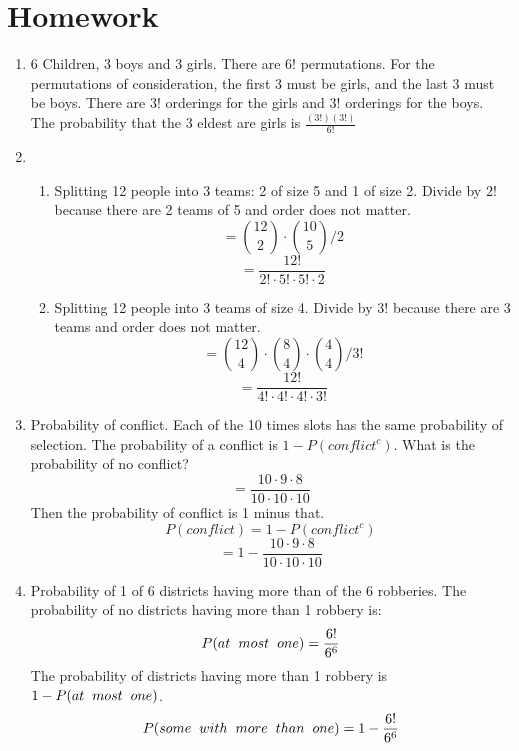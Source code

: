 \documentclass[11pt, oneside]{article}   	%
\begin{document}
\pagebreak
\section{Homework}
	\begin{enumerate}
		\item 6 Children, 3 boys and 3 girls. There are $6!$ permutations. For the permutations of consideration, the first 3 must be girls, and the last 3 must be boys. There are $3!$ orderings for the girls and $3!$ orderings for the boys. The probability that the 3 eldest are girls is $\frac{(3!)(3!)}{6!}$
		\item
			\begin{enumerate}
				\item Splitting 12 people into 3 teams: 2 of size 5 and 1 of size 2. Divide by $2!$ because there are 2 teams of 5 and order does not matter.
					\[
						= \binom{12}{2} \cdot \binom{10}{5} / 2
					\]
					\[
						= \frac{12!}{2! \cdot 5! \cdot 5! \cdot 2}
					\]
				\item Splitting 12 people into 3 teams of size 4. Divide by $3!$ because there are 3 teams and order does not matter.
					\[
						= \binom{12}{4} \cdot \binom{8}{4} \cdot \binom{4}{4} / 3!
					\]
					\[
						= \frac{12!}{4! \cdot 4! \cdot 4! \cdot 3!}
					\]			
			\end{enumerate}
		\item Probability of conflict. Each of the 10 times slots has the same probability of selection. The probability of a conflict is $1 - P(conflict^{c})$. What is the probability of no conflict?
			\[
				= \frac{10 \cdot 9 \cdot 8}{10 \cdot 10 \cdot 10}
			\]
			Then the probability of conflict is 1 minus that.
			\[
			P(conflict) = 1 - P(conflict^{c})	
			\]
			\[
				= 1 - \frac{10 \cdot 9 \cdot 8}{10 \cdot 10 \cdot 10}
			\]
		\item Probability of 1 of 6 districts having more than of the 6 robberies.
			The probability of no districts having more than 1 robbery is:
			\[
				P(at \hspace{2mm} most \hspace{2mm} one) = \frac{6!}{6^{6}}
			\]
			The probability of districts having more than 1 robbery is $1 - P(at \hspace{2mm} most \hspace{2mm} one)$.
			\[
				P(some \hspace{2mm} with \hspace{2mm} more \hspace{2mm} than \hspace{2mm} one) = 1 - \frac{6!}{6^{6}}
\]
\end{enumerate}
\end{document}
